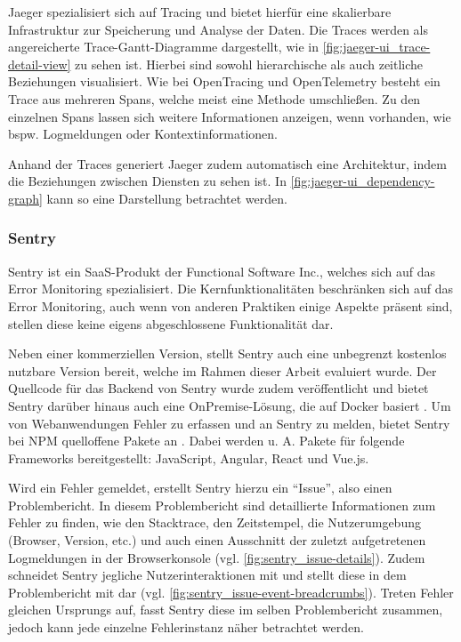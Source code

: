 Jaeger spezialisiert sich auf Tracing und bietet hierfür eine skalierbare Infrastruktur zur Speicherung und Analyse der Daten. Die Traces werden als angereicherte Trace-Gantt-Diagramme dargestellt, wie in \autoref{fig:jaeger-ui_trace-detail-view} zu sehen ist. Hierbei sind sowohl hierarchische als auch zeitliche Beziehungen visualisiert. Wie bei OpenTracing und OpenTelemetry besteht ein Trace aus mehreren Spans, welche meist eine Methode umschließen. Zu den einzelnen Spans lassen sich weitere Informationen anzeigen, wenn vorhanden, wie bspw. Logmeldungen oder Kontextinformationen.

Anhand der Traces generiert Jaeger zudem automatisch eine Architektur, indem die Beziehungen zwischen Diensten zu sehen ist. In \autoref{fig:jaeger-ui_dependency-graph} kann so eine Darstellung betrachtet werden.

\subsubsection{Sentry}

Sentry \cite{Sentry} ist ein SaaS-Produkt der Functional Software Inc., welches sich auf das Error Monitoring spezialisiert. Die Kernfunktionalitäten beschränken sich auf das Error Monitoring, auch wenn von anderen Praktiken einige Aspekte präsent sind, stellen diese keine eigens abgeschlossene Funktionalität dar.

Neben einer kommerziellen Version, stellt Sentry auch eine unbegrenzt kostenlos nutzbare Version bereit, welche im Rahmen dieser Arbeit evaluiert wurde. Der Quellcode für das Backend von Sentry wurde zudem veröffentlicht und bietet Sentry darüber hinaus auch eine OnPremise-Lösung, die auf Docker basiert \cite{SentrySelfHosted}. Um von Webanwendungen Fehler zu erfassen und an Sentry zu melden, bietet Sentry bei NPM \cite{NPM} quelloffene Pakete an \cite{SentryJSGithub}. Dabei werden u. A. Pakete für folgende Frameworks bereitgestellt: JavaScript, Angular, React und Vue.js.

Wird ein Fehler gemeldet, erstellt Sentry hierzu ein \enquote{Issue}, also einen Problembericht. In diesem Problembericht sind detaillierte Informationen zum Fehler zu finden, wie den Stacktrace, den Zeitstempel, die Nutzerumgebung (Browser, Version, etc.) und auch einen Ausschnitt der zuletzt aufgetretenen Logmeldungen in der Browserkonsole (vgl. \autoref{fig:sentry_issue-details}). Zudem schneidet Sentry jegliche Nutzerinteraktionen mit und stellt diese in dem Problembericht mit dar (vgl. \autoref{fig:sentry_issue-event-breadcrumbs}). Treten Fehler gleichen Ursprungs auf, fasst Sentry diese im selben Problembericht zusammen, jedoch kann jede einzelne Fehlerinstanz näher betrachtet werden.

